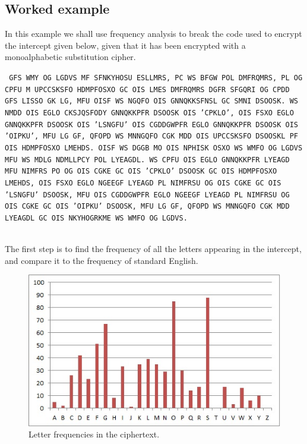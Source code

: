 \documentclass[Lau,binding=0.6cm,oneside]{sapthesis}
\begin{document}
\subsection{Worked example}
In this example we shall use frequency analysis to break the code used to encrypt the intercept given below, given that it has been encrypted with a monoalphabetic substitution cipher.\\

\begin{displayquote}\texttt{{\small
GFS WMY OG LGDVS MF SFNKYHOSU ESLLMRS, PC WS BFGW POL DMFRQMRS, PL OG CPFU M UPCCSKSFO HDMPFOSXO GC OIS LMES DMFRQMRS DGFR SFGQRI OG CPDD GFS LISSO GK LG, MFU OISF WS NGQFO OIS GNNQKKSFNSL GC SMNI DSOOSK. WS NMDD OIS EGLO CKSJQSFODY GNNQKKPFR DSOOSK OIS 'CPKLO', OIS FSXO EGLO GNNQKKPFR DSOOSK OIS 'LSNGFU' OIS CGDDGWPFR EGLO GNNQKKPFR DSOOSK OIS 'OIPKU', MFU LG GF, QFOPD WS MNNGQFO CGK MDD OIS UPCCSKSFO DSOOSKL PF OIS HDMPFOSXO LMEHDS. OISF WS DGGB MO OIS NPHISK OSXO WS WMFO OG LGDVS MFU WS MDLG NDMLLPCY POL LYEAGDL. WS CPFU OIS EGLO GNNQKKPFR LYEAGD MFU NIMFRS PO OG OIS CGKE GC OIS 'CPKLO' DSOOSK GC OIS HDMPFOSXO LMEHDS, OIS FSXO EGLO NGEEGF LYEAGD PL NIMFRSU OG OIS CGKE GC OIS 'LSNGFU' DSOOSK, MFU OIS CGDDGWPFR EGLO NGEEGF LYEAGD PL NIMFRSU OG OIS CGKE GC OIS 'OIPKU' DSOOSK, MFU LG GF, QFOPD WS MNNGQFO CGK MDD LYEAGDL GC OIS NKYHOGRKME WS WMFO OG LGDVS.
}}
\end{displayquote}
\ \\
The first step is to find the frequency of all the letters appearing in the intercept, and compare it to the frequency of standard English.\\
\begin{figure}[H]
\includegraphics[scale=0.7]{frequency_analysis_example}
\centering
\caption{Letter frequencies in the ciphertext.}
\centering
\end{figure}
\end{document}
